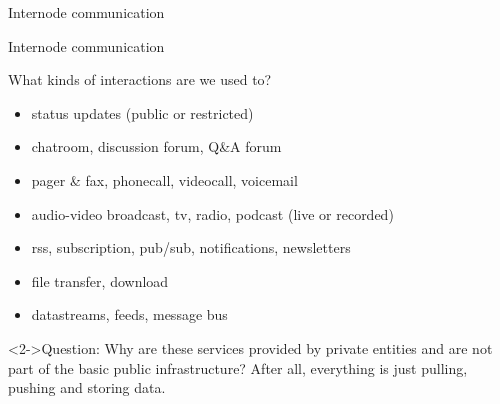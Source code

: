 \documentclass{beamer}
\begin{document}
\begin{section}{Internode communication}
\begin{frame}{Internode communication}
\begin{block}{What kinds of interactions are we used to?}
 \begin{itemize}
    \item status updates (public or restricted)
    \item chatroom, discussion forum, Q\&A forum
    \item pager \& fax, phonecall, videocall, voicemail
    \item audio-video broadcast, tv, radio, podcast (live or recorded)
    \item rss, subscription, pub/sub, notifications, newsletters
    \item file transfer, download
    \item datastreams, feeds, message bus
 \end{itemize}
\end{block}
\begin{block}<2->{Question:}
 Why are these services provided by private entities and are not part of the basic public infrastructure? After all, everything is just pulling, pushing and storing data.
\end{block}
\end{frame}


\end{section}
\end{document}

